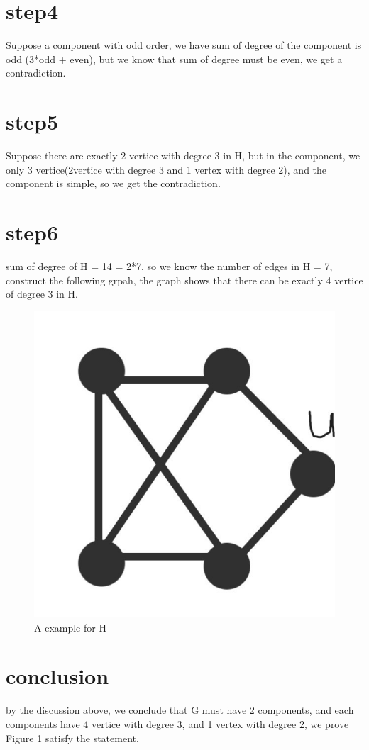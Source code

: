 \documentclass{article}
\begin{document}
\begin{CJK*}{UTF8}{bkai}
\section*{step4}
Suppose a component with odd order, we have sum of degree of the component is odd (3*odd + even), but we know that sum of degree must be even, we get a contradiction.
\section*{step5}
Suppose there are exactly 2 vertice with degree 3 in H, but in the component, we only 3 vertice(2vertice with degree 3 and 1 vertex with degree 2), and the component is simple, so we get the contradiction.
\section*{step6}
sum of degree of H = 14 = 2*7, so we know the number of edges in H = 7, construct the following grpah, the graph shows that there can be exactly 4 vertice of degree 3 in H.
\begin{figure}[H]
    \centering
    \includegraphics[scale = 0.1]{hw8gleft.jpg}
    \caption{A example for H}
\end{figure}
\section*{conclusion}
by the discussion above, we conclude that G must have 2 components, and each components have 4 vertice with degree 3, and 1 vertex with degree 2, we prove Figure 1 satisfy the statement.

\end{CJK*}
\end{document}
